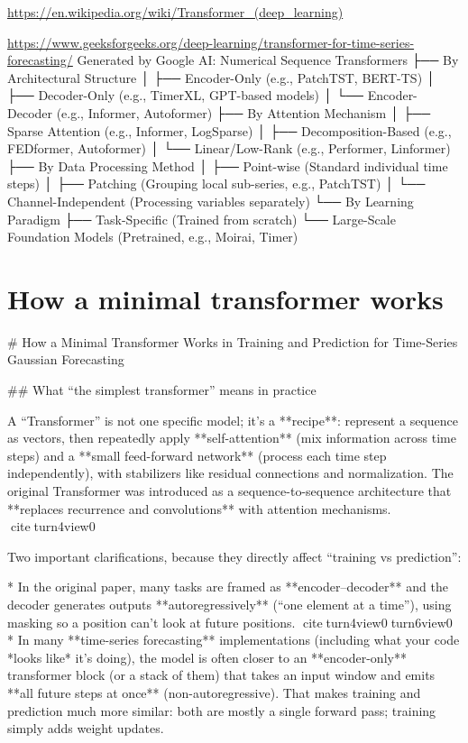 \documentclass[a4paper]{article}
\title{}
\date{}
\begin{document}
    \maketitle
    \url{https://en.wikipedia.org/wiki/Transformer_(deep_learning)}
    
    \url{https://www.geeksforgeeks.org/deep-learning/transformer-for-time-series-forecasting/}
    Generated by Google AI:
    Numerical Sequence Transformers
    ├── By Architectural Structure
    │ ├── Encoder-Only (e.g., PatchTST, BERT-TS)
    │ ├── Decoder-Only (e.g., TimerXL, GPT-based models)
    │ └── Encoder-Decoder (e.g., Informer, Autoformer)
    ├── By Attention Mechanism
    │ ├── Sparse Attention (e.g., Informer, LogSparse)
    │ ├── Decomposition-Based (e.g., FEDformer, Autoformer)
    │ └── Linear/Low-Rank (e.g., Performer, Linformer)
    ├── By Data Processing Method
    │ ├── Point-wise (Standard individual time steps)
    │ ├── Patching (Grouping local sub-series, e.g., PatchTST)
    │ └── Channel-Independent (Processing variables separately)
    └── By Learning Paradigm
    ├── Task-Specific (Trained from scratch)
    └── Large-Scale Foundation Models (Pretrained, e.g., Moirai, Timer)
    
    
    \section{How a minimal transformer works}
    # How a Minimal Transformer Works in Training and Prediction for Time-Series Gaussian Forecasting

    ## What “the simplest transformer” means in practice
    
    A “Transformer” is not one specific model; it’s a **recipe**: represent a sequence as vectors, then repeatedly apply **self-attention** (mix information across time steps) and a **small feed-forward network** (process each time step independently), with stabilizers like residual connections and normalization. The original Transformer was introduced as a sequence-to-sequence architecture that **replaces recurrence and convolutions** with attention mechanisms. citeturn4view0
    
    Two important clarifications, because they directly affect “training vs prediction”:
    
    * In the original paper, many tasks are framed as **encoder–decoder** and the decoder generates outputs **autoregressively** (“one element at a time”), using masking so a position can’t look at future positions. citeturn4view0turn6view0
    * In many **time-series forecasting** implementations (including what your code *looks like* it’s doing), the model is often closer to an **encoder-only** transformer block (or a stack of them) that takes an input window and emits **all future steps at once** (non-autoregressive). That makes training and prediction much more similar: both are mostly a single forward pass; training simply adds weight updates.
    
\end{document}
